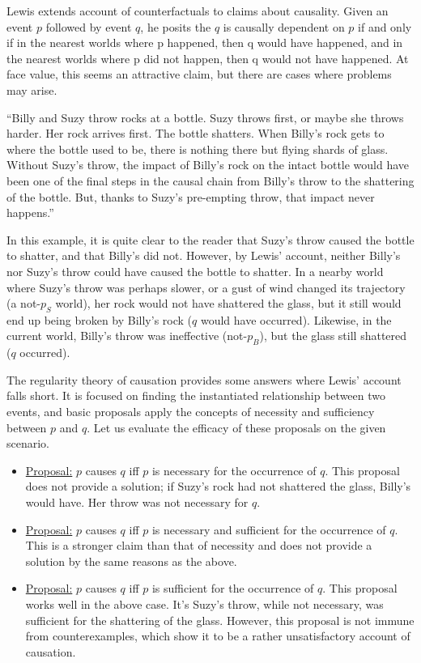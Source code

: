 \documentclass{article}
\begin{document}
Lewis extends account of counterfactuals to claims about causality. Given an event $p$ followed by event $q$, he posits the $q$ is causally dependent on $p$ if and only if in the nearest worlds where p happened, then q would have happened, and in the nearest worlds where p did not happen, then q would not have happened. At face value, this seems an attractive claim, but there are cases where problems may arise.

\begin{displayquote}
``Billy and Suzy throw rocks at a bottle. Suzy throws first, or maybe she throws harder. Her rock arrives first. The bottle shatters. When Billy's rock gets to where the bottle used to be, there is nothing there but flying shards of glass. Without Suzy's throw, the impact of Billy's rock on the intact bottle would have been one of the final steps in the causal chain from Billy's throw to the shattering of the bottle. But, thanks to Suzy's pre-empting throw, that impact never happens.''
\end{displayquote}

In this example, it is quite clear to the reader that Suzy's throw caused the bottle to shatter, and that Billy's did not. However, by Lewis' account, neither Billy's nor Suzy's throw could have caused the bottle to shatter. In a nearby world where Suzy's throw was perhaps slower, or a gust of wind changed its trajectory (a not-$p_S$ world), her rock would not have shattered the glass, but it still would end up being broken by Billy's rock ($q$ would have occurred). Likewise, in the current world, Billy's throw was ineffective (not-$p_B$), but the glass still shattered ($q$ occurred).

The regularity theory of causation provides some answers where Lewis' account falls short. It is focused on finding the instantiated relationship between two events, and basic proposals apply the concepts of necessity and sufficiency between $p$ and $q$. Let us evaluate the efficacy of these proposals on the given scenario.

    \begin{itemize}
    \item \underline{Proposal:} $p$ causes $q$ iff $p$ is necessary for the occurrence of $q$. \smallbreak
        This proposal does not provide a solution; if Suzy's rock had not shattered the glass, Billy's would have. Her throw was not necessary for $q$.
    \item \underline{Proposal:} $p$ causes $q$ iff $p$ is necessary and sufficient for the occurrence of $q$. \smallbreak
        This is a stronger claim than that of necessity and does not provide a solution by the same reasons as the above.
    \item \underline{Proposal:} $p$ causes $q$ iff $p$ is sufficient for the occurrence of $q$. \smallbreak
        This proposal works well in the above case. It's Suzy's throw, while not necessary, was sufficient for the shattering of the glass. However, this proposal is not immune from counterexamples, which show it to be a rather unsatisfactory account of causation.
    \end{itemize}
\end{document}
